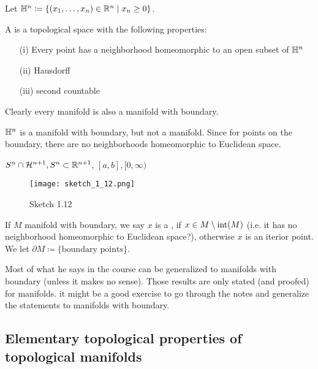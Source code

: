 Let \(\mathbb{H}^n\coloneqq \{(x_1,\dots,x_n)\in\mathbb{R}^n\mid x_n\geq 0\}\).
\begin{definition*}
    A  is a topological space with the following properties:
    \begin{enumerate}
        \item[(i)] Every point has a neighborhood homeomorphic to an open subset of \(\mathbb{H}^n\)
        \item[(ii)] Hausdorff
        \item[(iii)] second countable   
    \end{enumerate}
\end{definition*}

Clearly every manifold is also a manifold with boundary.

\begin{example}
    \(\mathbb{H}^n\) is a manifold with boundary, but not a manifold. Since for points on the boundary, there are no neighborhoods homeomorphic to Euclidean space.
\end{example}

\begin{example}
    \(S^n\cap \mathcal{H}^{n+1},S^n\subset\mathbb{R}^{n+1}\), \([a,b],[0,\infty)\)
    \begin{figure}[H]
        \centering
        \texttt{[image: sketch\_1\_12.png]}
        \caption{Sketch 1.12}
    \end{figure}
\end{example}

\begin{definition*}
    If \(M\) manifold with boundary, we say \(x\) is a , if \(x\in M\setminus\text{int}(M)\) (i.e. it has no neighborhood homeomorphic to Euclidean space?), otherwise \(x\) is an iterior point. We let \(\partial M \coloneqq \{\text{boundary points}\}\).
\end{definition*}
\begin{remark}
    Most of what he says in the course can be generalized to manifolds with boundary (unless it makes no sense).
    Those results are only stated (and proofed) for manifolds. it might be a good exercise to go through the notes and generalize the statements to manifolds with boundary.
\end{remark}

\subsection{Elementary topological properties of topological manifolds}

